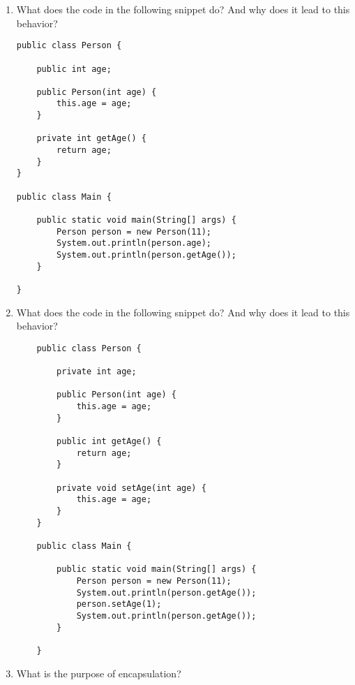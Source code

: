 \documentclass[12pt,letterpaper]{article}
\begin{document}
\begin{enumerate}
\begin{lstlisting}
}
\end{lstlisting}

\newpage


\item
What does the code in the following snippet do? And why does it lead to this behavior?
\begin{lstlisting}
public class Person {

    public int age;

    public Person(int age) {
        this.age = age;
    }

    private int getAge() {
        return age;
    }
}
    
public class Main {

    public static void main(String[] args) {
        Person person = new Person(11);
        System.out.println(person.age);
        System.out.println(person.getAge());
    }

}
\end{lstlisting}

\newpage

\item
What does the code in the following snippet do? And why does it lead to this behavior?
\begin{lstlisting}
    public class Person {

        private int age;

        public Person(int age) {
            this.age = age;
        }

        public int getAge() {
            return age;
        }

        private void setAge(int age) {
            this.age = age;
        }
    }

    public class Main {

        public static void main(String[] args) {
            Person person = new Person(11);
            System.out.println(person.getAge());
            person.setAge(1);
            System.out.println(person.getAge());
        }

    }
\end{lstlisting}

\item
What is the purpose of encapsulation?

\end{enumerate}
\end{document}

